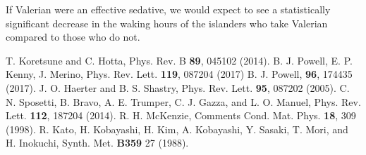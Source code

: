 \documentclass[10pt,preprintnumbers,amsmath,amssymb,floatfix,twocolumn,prl]{revtex4-2}
\begin{document}
If Valerian were an effective sedative, we would expect to see a statistically significant decrease in the waking hours of the islanders who take Valerian compared to those who do not.





\begin{thebibliography}{99} 
	 T. Koretsune and C. Hotta, Phys. Rev. B \textbf{89}, 045102 (2014).
	 B. J. Powell, E. P. Kenny, J. Merino, Phys. Rev. Lett. \textbf{119}, 087204 (2017)
	 B. J. Powell, \prb\xspace \textbf{96}, 174435 (2017).
	  J. O. Haerter and B. S. Shastry,  Phys. Rev. Lett. \textbf{95}, 087202 (2005).
	  C. N. Sposetti, B. Bravo, A. E. Trumper, C. J. Gazza, and L. O. Manuel, Phys. Rev. Lett. \textbf{112}, 187204 (2014).
	 R. H. McKenzie,  Comments Cond. Mat. Phys. \textbf{18}, 309 (1998). 
	 R. Kato, H. Kobayashi, H. Kim, A. Kobayashi, Y. Sasaki, T. Mori, and H. Inokuchi, Synth. Met. \textbf{B359} 27 (1988). 

 
\end{thebibliography}
\end{document}

